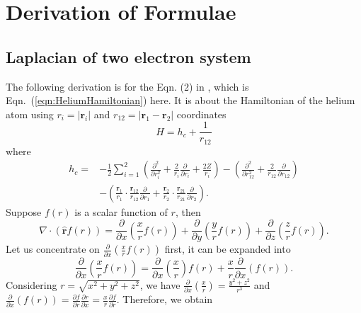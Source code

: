 
\section{Derivation of Formulae}
\renewcommand{\theequation}{\thesection.\arabic{equation}}
\setcounter{equation}{0}
\subsection{Laplacian of two electron system}
\label{subsec:Laplacian}
The following derivation is for the Eqn. (2) in \cite{giner2021transcorrelated}, which is Eqn.~(\ref{eqn:HeliumHamiltonian}) here. It is about the Hamiltonian of the helium atom using $r_i=|\textbf{r}_i|$ and $r_{12}=|\textbf{r}_1-\textbf{r}_2|$ coordinates
\begin{equation}
    H=h_c+\frac{1}{r_{12}}
\end{equation}
where 
\begin{equation}
    \begin{split}
        h_c=&-\frac{1}{2}\sum_{i=1}^{2}\left(\frac{\partial^2}{\partial r_i^2}+\frac{2}{r_i}\frac{\partial}{\partial r_i}+\frac{2Z}{r_i}\right)-\left(\frac{\partial^2}{\partial r_{12}^2}+\frac{2}{r_{12}}\frac{\partial}{\partial r_{12}}\right) \\
        &-\left(\frac{\textbf{r}_1}{r_1}\cdot\frac{\textbf{r}_{12}}{r_{12}}\frac{\partial}{\partial r_1}+\frac{\textbf{r}_2}{r_2}\cdot\frac{\textbf{r}_{21}}{r_{21}}\frac{\partial}{\partial r_2}\right).
    \end{split}    
    \label{eqn:HeliumHamiltonian}
\end{equation}
Suppose $f(r)$ is a scalar function of $r$, then
\begin{equation}
    \nabla\cdot\left(\hat{\textbf{r}}f(r)\right)=\frac{\partial}{\partial x}\left(\frac{x}{r}f(r)\right)+\frac{\partial}{\partial y}\left(\frac{y}{r}f(r)\right)+\frac{\partial}{\partial z}\left(\frac{z}{r}f(r)\right).
\end{equation}
Let us concentrate on $\frac{\partial}{\partial x}\left(\frac{x}{r}f(r)\right)$ first, it can be expanded into 
\begin{equation}
    \frac{\partial}{\partial x}\left(\frac{x}{r}f(r)\right)=\frac{\partial}{\partial x}\left(\frac{x}{r}\right)f(r)+\frac{x}{r}\frac{\partial}{\partial x}\left(f(r)\right).
\end{equation}
Considering $r=\sqrt{x^2+y^2+z^2}$, we have $\frac{\partial}{\partial x}(\frac{x}{r})=\frac{y^2+z^2}{r^3}$ and $\frac{\partial}{\partial x}(f(r))=\frac{\partial f}{\partial r}\frac{\partial r}{\partial x}=\frac{x}{r}\frac{\partial f}{\partial r}$. Therefore, we obtain

